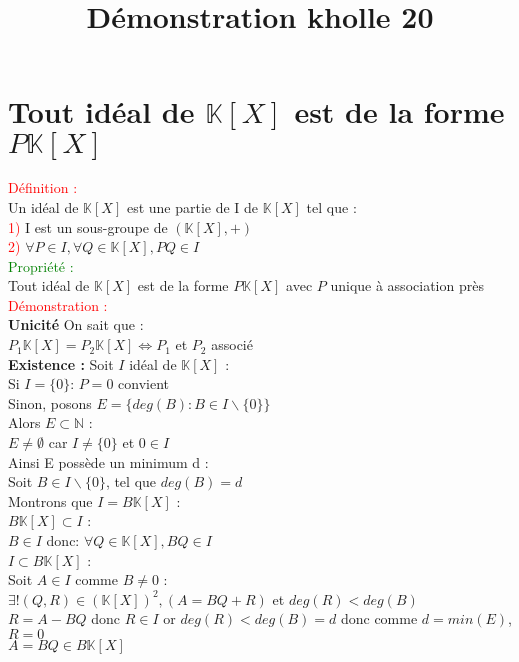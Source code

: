 \documentclass{article}
\begin{document}
\title{Démonstration kholle 20}
\date{}
\maketitle
	\renewcommand{\thesection}{\Roman{section}}
	\setlength{\parindent}{1.5cm}
\section{Tout idéal de $\mathbb K [X]$ est de la forme $P \mathbb K [X]$}
\textcolor{red}{Définition :} \\
Un idéal de $\mathbb{K}[X]$ est une partie de I de $\mathbb K [X]$ tel que : \\
\textcolor{red}{1)} I est un sous-groupe de $(\mathbb K[X],+)$ \\
\textcolor{red}{2)} $\forall P \in I, \forall Q \in \mathbb K[X], PQ \in I$ \\
\textcolor{green}{Propriété :} \\
Tout idéal de $\mathbb K [X]$ est de la forme $P \mathbb K[X]$ avec $P$ unique à association près \\
\textcolor{red}{Démonstration :} \\
{\bf Unicité} On sait que : \\
$P_1 \mathbb K [X]=P_2 \mathbb K [X] \Longleftrightarrow P_1$ et $P_2$ associé \\
{\bf Existence :} Soit $I$ idéal de $\mathbb K [X] $ : \\
Si $I=\lbrace 0 \rbrace$: $P=0$ convient \\
Sinon, posons $E= \lbrace deg(B):B \in I \backslash \lbrace 0 \rbrace \rbrace $ \\
Alors $E \subset \mathbb{N}$ : \\
$E \neq \emptyset$ car $I \neq \lbrace 0 \rbrace$ et $0 \in I$ \\
Ainsi E possède un minimum d : \\
Soit $B \in I \backslash \lbrace 0 \rbrace$, tel que $deg(B)=d$ \\
Montrons que $I=B \mathbb K [X]$ : \\
{\boldmath$B \mathbb K [X] \subset I$ }: \\
$B \in I$ donc: $ \forall Q \in \mathbb K[X], BQ \in I$ \\
{\boldmath$I \subset B \mathbb K [X]$} :\\
Soit $A \in I$ comme $B \neq 0$ : \\
$\exists ! (Q,R) \in (\mathbb K [X])^2, (A=BQ+R)$ et $deg(R) < deg(B)$ \\
$R=A-BQ$ donc $R \in I$ or $deg(R)<deg(B)=d$ donc comme $d=min(E)$, $R=0$ \\
$A=BQ \in B \mathbb K [X]$
\end{document}

